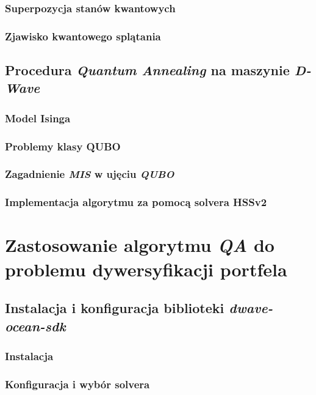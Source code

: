 \documentclass[12pt,a4paper,twoside,openany]{book}
\begin{document}
\subsection{Superpozycja stanów kwantowych}

\subsection{Zjawisko kwantowego splątania}

\section{Procedura \textit{Quantum Annealing} na maszynie \textit{D-Wave}}

\subsection{Model Isinga}

\subsection{Problemy klasy QUBO}

\subsection{Zagadnienie \textit{MIS} w ujęciu \textit{QUBO}}

\subsection{Implementacja algorytmu za pomocą solvera HSSv2}




\chapter{Zastosowanie algorytmu \textit{QA} do problemu dywersyfikacji portfela}

\section{Instalacja i konfiguracja biblioteki \textit{dwave-ocean-sdk}}
\subsection{Instalacja}

\subsection{Konfiguracja i wybór solvera}
\end{document}
